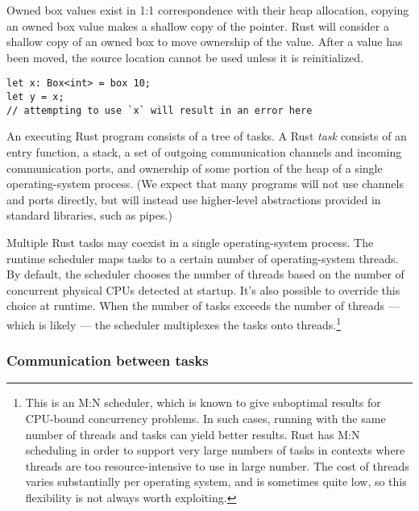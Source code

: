 \documentclass[]{article}
\begin{document}
Owned box values exist in 1:1 correspondence with their heap allocation,
copying an owned box value makes a shallow copy of the pointer. Rust
will consider a shallow copy of an owned box to move ownership of the
value. After a value has been moved, the source location cannot be used
unless it is reinitialized.

\begin{verbatim}
let x: Box<int> = box 10;
let y = x;
// attempting to use `x` will result in an error here
\end{verbatim}


An executing Rust program consists of a tree of tasks. A Rust
\emph{task} consists of an entry function, a stack, a set of outgoing
communication channels and incoming communication ports, and ownership
of some portion of the heap of a single operating-system process. (We
expect that many programs will not use channels and ports directly, but
will instead use higher-level abstractions provided in standard
libraries, such as pipes.)

Multiple Rust tasks may coexist in a single operating-system process.
The runtime scheduler maps tasks to a certain number of operating-system
threads. By default, the scheduler chooses the number of threads based
on the number of concurrent physical CPUs detected at startup. It's also
possible to override this choice at runtime. When the number of tasks
exceeds the number of threads --- which is likely --- the scheduler
multiplexes the tasks onto threads.\footnote{This is an M:N scheduler,
  which is known to give suboptimal results for CPU-bound concurrency
  problems. In such cases, running with the same number of threads and
  tasks can yield better results. Rust has M:N scheduling in order to
  support very large numbers of tasks in contexts where threads are too
  resource-intensive to use in large number. The cost of threads varies
  substantially per operating system, and is sometimes quite low, so
  this flexibility is not always worth exploiting.}

\subsubsection{Communication between
tasks}\label{communication-between-tasks}
\end{document}
